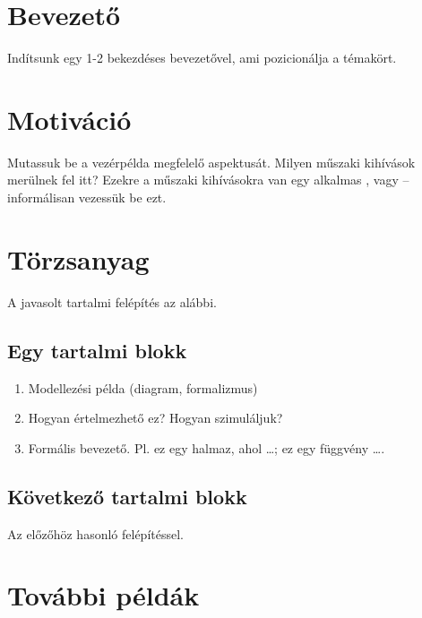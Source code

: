 
\section{Bevezető}

Indítsunk egy 1-2 bekezdéses bevezetővel, ami pozicionálja a témakört.

\section{Motiváció}

Mutassuk be a vezérpélda megfelelő aspektusát. Milyen műszaki kihívások merülnek fel itt? Ezekre a műszaki kihívásokra van egy alkalmas ,  vagy  -- informálisan vezessük be ezt.

\section{Törzsanyag}

A javasolt tartalmi felépítés az alábbi.

\subsection{Egy tartalmi blokk}

\begin{mdframed}
	\begin{enumerate}
	\item Modellezési példa (diagram, formalizmus)

	\item Hogyan értelmezhető ez? Hogyan szimuláljuk?

	\item Formális bevezető. Pl. ez egy halmaz, ahol \ldots; ez egy függvény \ldots.
	\end{enumerate}
\end{mdframed}

\subsection{Következő tartalmi blokk}

Az előzőhöz hasonló felépítéssel.

\section{További példák}

